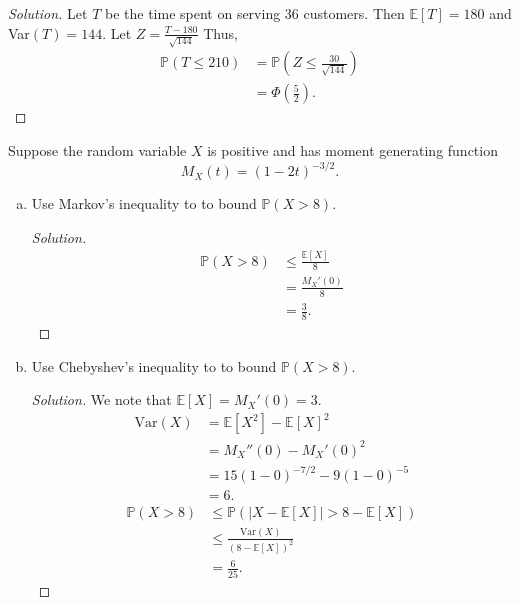 \documentclass[addpoints, 11pt]{exam}
\newcommand*{\prob}{\mathds{P}}
\newcommand*{\E}{\mathds{E}}
\newenvironment{question}[1]{\smallskip\noindent\color{crimson}{\bf Question #1.}}{}
\begin{document}
\begin{proof}[Solution]
    Let $T$ be the time spent on serving 36 customers. Then $\E[T] = 180$ and Var$(T) = 144$. Let $Z = \frac{T - 180}{\sqrt{144}}$ Thus,
    \begin{align*}
        \prob(T \leq 210)
        &= \prob\left(Z \leq \frac{30}{\sqrt{144}}\right) \\
        &= \Phi\left(\frac{5}{2}\right).
    \end{align*}
\end{proof}

\newpage

\begin{question}{5}
     Suppose the random variable $X$ is positive and has moment generating function
     \[
        M_X(t) = (1 - 2t)^{-3/2}.
     \]
\end{question}

\begin{enumerate}[(a)]
    \color{crimson}
    \item  Use Markov’s inequality to to bound $\prob(X > 8)$.
    \normalcolor
    
    \begin{proof}[Solution]
        \begin{align*}
            \prob(X > 8)
            &\leq \frac{\E[X]}{8} \\
            &= \frac{M_X'(0)}{8} \\
            &= \frac{3}{8}.
        \end{align*}
    \end{proof}

    \color{crimson}
    \item  Use Chebyshev’s inequality to to bound $\prob(X > 8)$.
    \normalcolor
    
    \begin{proof}[Solution]
    We note that $\E[X] = M_X'(0) = 3$.
    \begin{align*}
        \text{Var}(X)
        &= \E[X^2] - \E[X]^2 \\
        &= M_X''(0) - M_X'(0)^2 \\
        &= 15(1 - 0)^{-7/2} - 9(1 - 0)^{-5} \\
        &= 6.
    \end{align*}
        \begin{align*}
            \prob(X > 8)
            &\leq \prob(|X - \E[X]| > 8 - \E[X]) \\
            &\leq \frac{\text{Var}(X)}{(8 - \E[X])^2} \\
            &= \frac{6}{25}.
        \end{align*}
    \end{proof}
\end{enumerate}
\end{document}
